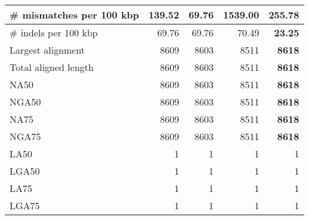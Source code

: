 \documentclass[12pt,a4paper]{article}
\begin{document}
\begin{table}[ht]
\begin{center}
\begin{tabular}{|l*{4}{|r}|}
\# mismatches per 100 kbp & 139.52 & {\bf 69.76} & 1539.00 & 255.78 \\ \hline
\# indels per 100 kbp & 69.76 & 69.76 & 70.49 & {\bf 23.25} \\ \hline
Largest alignment & 8609 & 8603 & 8511 & {\bf 8618} \\ \hline
Total aligned length & 8609 & 8603 & 8511 & {\bf 8618} \\ \hline
NA50 & 8609 & 8603 & 8511 & {\bf 8618} \\ \hline
NGA50 & 8609 & 8603 & 8511 & {\bf 8618} \\ \hline
NA75 & 8609 & 8603 & 8511 & {\bf 8618} \\ \hline
NGA75 & 8609 & 8603 & 8511 & {\bf 8618} \\ \hline
LA50 & 1 & 1 & 1 & 1 \\ \hline
LGA50 & 1 & 1 & 1 & 1 \\ \hline
LA75 & 1 & 1 & 1 & 1 \\ \hline
LGA75 & 1 & 1 & 1 & 1 \\ \hline
\end{tabular}
\end{center}
\end{table}
\end{document}
